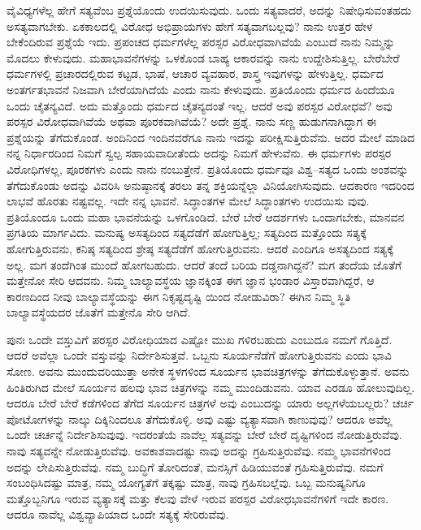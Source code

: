 ವೈವಿಧ್ಯಗಳೆಲ್ಲ ಹೇಗೆ ಸತ್ಯವೆಂಬ ಪ್ರಶ್ನೆಯೊಂದು ಉದಯಿಸುವುದು. ಒಂದು ಸತ್ಯವಾದರೆ, ಅದನ್ನು ನಿಷೇಧಿಸುವಂತಹದು ಅಸತ್ಯವಾಗಬೇಕು. ಏಕಕಾಲದಲ್ಲಿ ವಿರೋಧ ಅಭಿಪ್ರಾಯಗಳು ಹೇಗೆ ಸತ್ಯವಾಗಬಲ್ಲವು? ನಾನು ಉತ್ತರ ಹೇಳ ಬೇಕೆಂದಿರುವ ಪ್ರಶ್ನೆಯೆ ಇದು. ಪ್ರಪಂಚದ ಧರ್ಮಗಳೆಲ್ಲ ಪರಸ್ಪರ ವಿರೋಧವಾಗಿವೆಯೆ ಎಂಬುದೆ ನಾನು ನಿಮ್ಮನ್ನು ಮೊದಲು ಕೇಳುವುದು. ಮಹಾಭಾವನೆಗಳನ್ನು ಒಳಕೊಂಡ ಬಾಹ್ಯ ಆಕಾರವನ್ನು ನಾನು ಉದ್ದೇಶಿಸುತ್ತಿಲ್ಲ. ಬೇರೆಬೇರೆ ಧರ್ಮಗಳಲ್ಲಿ ಪ್ರಚಾರದಲ್ಲಿರುವ ಕಟ್ಟಡ, ಭಾಷೆ, ಆಚಾರ ವ್ಯವಹಾರ, ಶಾಸ್ತ್ರ ಇವುಗಳನ್ನು ಹೇಳುತ್ತಿಲ್ಲ. ಧರ್ಮದ ಅಂತರ್ಗತಭಾವನೆ ನಿಜವಾಗಿ ಬೇರೆಯಾಗಿದೆಯೆ ಎಂದು ನಾನು ಕೇಳುವುದು. ಪ್ರತಿಯೊಂದು ಧರ್ಮದ ಹಿಂದೆಯೂ ಒಂದು ಚೈತನ್ಯವಿದೆ. ಅದು ಮತ್ತೊಂದು ಧರ್ಮದ ಚೈತನ್ಯದಂತೆ ಇಲ್ಲ. ಆದರೆ ಅವು ಪರಸ್ಪರ ವಿರೋಧವೆ? ಅವು ಪರಸ್ಪರ ವಿರೋಧವಾಗಿವೆಯೆ ಅಥವಾ ಪೂರಕವಾಗಿವೆಯೆ? ಅದೇ ಪ್ರಶ್ನೆ. ನಾನು ಸಣ್ಣ ಹುಡುಗನಾಗಿದ್ದಾಗ ಈ ಪ್ರಶ್ನೆಯನ್ನು ತೆಗೆದುಕೊಂಡೆ. ಅಂದಿನಿಂದ ಇಂದಿನವರೆಗೂ ನಾನು ಇದನ್ನು ಪರೀಕ್ಷಿಸುತ್ತಿರುವೆನು. ಅದರ ಮೇಲೆ ಮಾಡಿದ ನನ್ನ ನಿರ್ಧಾರದಿಂದ ನಿಮಗೆ ಸ್ವಲ್ಪ ಸಹಾಯವಾದೀತೆಂದು ಅದನ್ನು ನಿಮಗೆ ಹೇಳುವೆನು. ಈ ಧರ್ಮಗಳು ಪರಸ್ಪರ ವಿರೋಧಿಗಳಲ್ಲ, ಪೂರಕಗಳು ಎಂದು ನಾನು ನಂಬುತ್ತೇನೆ. ಪ್ರತಿಯೊಂದು ಧರ್ಮವೂ ವಿಶ್ವ–ಸತ್ಯದ ಒಂದು ಅಂಶವನ್ನು ತೆಗೆದುಕೊಂಡು ಅದನ್ನು ವಿವರಿಸಿ ಅನುಷ್ಠಾನಕ್ಕೆ ತರಲು ತನ್ನ ಶಕ್ತಿಯನ್ನೆಲ್ಲಾ ವಿನಿಯೋಗಿಸುವುದು. ಆದಕಾರಣ ಇದರಿಂದ ಲಾಭವೆ ಹೊರತು ನಷ್ಟವಲ್ಲ. ಇದೇ ನನ್ನ ಭಾವನೆ. ಸಿದ್ಧಾಂತಗಳ ಮೇಲೆ ಸಿದ್ಧಾಂತಗಳು ಉದಯಿಸು ವುವು. ಪ್ರತಿಯೊಂದೂ ಒಂದು ಮಹಾ ಭಾವನೆಯನ್ನು ಒಳಗೊಂಡಿದೆ. ಬೇರೆ ಬೇರೆ ಆದರ್ಶಗಳು ಒಂದಾಗಬೇಕು, ಮಾನವನ ಪ್ರಗತಿಯ ಮಾರ್ಗವಿದು. ಮನುಷ್ಯ ಅಸತ್ಯದಿಂದ ಸತ್ಯದೆಡೆಗೆ ಹೋಗುತ್ತಿಲ್ಲ; ಸತ್ಯದಿಂದ ಮತ್ತೊಂದು ಸತ್ಯಕ್ಕೆ ಹೋಗುತ್ತಿರುವನು, ಕನಿಷ್ಠ ಸತ್ಯದಿಂದ ಶ್ರೇಷ್ಠ ಸತ್ಯದೆಡೆಗೆ ಹೋಗುತ್ತಿರುವನು. ಆದರೆ ಎಂದಿಗೂ ಅಸತ್ಯದಿಂದ ಸತ್ಯಕ್ಕೆ ಅಲ್ಲ. ಮಗ ತಂದೆಗಿಂತ ಮುಂದೆ ಹೋಗಬಹುದು. ಆದರೆ ತಂದೆ ಬರಿಯ ದಡ್ಡನಾಗಿದ್ದನೆ? ಮಗ ತಂದೆಯ ಜೊತೆಗೆ ಮತ್ತೇನೋ ಸೇರಿ ಆದವನು. ನಿಮ್ಮ ಬಾಲ್ಯಾವಸ್ಥೆಯ ಜ್ಞಾನಕ್ಕಿಂತ ಈಗ ಜ್ಞಾನ ಭಂಡಾರ ವಿಸ್ತಾರವಾಗಿದ್ದರೆ, ಆ ಕಾರಣದಿಂದ ನೀವು ಬಾಲ್ಯಾವಸ್ಥೆಯನ್ನು ಈಗ ನಿಕೃಷ್ಟದೃಷ್ಟಿ ಯಿಂದ ನೋಡುವಿರಾ? ಈಗಿನ ನಿಮ್ಮ ಸ್ಥಿತಿ ಬಾಲ್ಯಾವಸ್ಥೆಯದರ ಜೊತೆಗೆ ಮತ್ತೇನೊ ಸೇರಿ ಆಗಿದೆ.

ಪುನಃ ಒಂದೇ ವಸ್ತುವಿಗೆ ಪರಸ್ಪರ ವಿರೋಧಿಯಾದ ಎಷ್ಟೋ ಮುಖ ಗಳಿರಬಹುದು ಎಂಬುದೂ ನಮಗೆ ಗೊತ್ತಿದೆ. ಆದರೆ ಅವೆಲ್ಲಾ ಒಂದೇ ವಸ್ತುವನ್ನು ನಿರ್ದೇಶಿಸುತ್ತವೆ. ಒಬ್ಬನು ಸೂರ್ಯನೆಡೆಗೆ ಹೋಗುತ್ತಿರುವನು ಎಂದು ಭಾವಿ ಸೋಣ. ಅವನು ಮುಂದುವರಿಯುತ್ತಾ ಅನೇಕ ಸ್ಥಳಗಳಿಂದ ಸೂರ್ಯನ ಭಾವಚಿತ್ರಗಳನ್ನು ತೆಗೆದುಕೊಳ್ಳುತ್ತಾನೆ. ಅವನು ಹಿಂತಿರುಗಿದ ಮೇಲೆ ಸೂರ್ಯನ ಹಲವು ಭಾವ ಚಿತ್ರಗಳನ್ನು ನಮ್ಮ ಮುಂದಿಡುವನು. ಯಾವ ಎರಡೂ ಹೋಲುವುದಿಲ್ಲ. ಆದರೂ ಬೇರೆ ಬೇರೆ ಕಡೆಗಳಿಂದ ತೆಗೆದ ಸೂರ್ಯನ ಚಿತ್ರಗಳೆ ಅವು ಎಂಬುದನ್ನು ಯಾರು ಅಲ್ಲಗಳೆಯಬಲ್ಲರು? ಚರ್ಚಿ ಪೋಟೋಗಳನ್ನು ನಾಲ್ಕು ದಿಕ್ಕಿನಿಂದಲೂ ತೆಗೆದುಕೊಳ್ಳಿ. ಅವು ಎಷ್ಟು ವ್ಯತ್ಯಾಸವಾಗಿ ಕಾಣುವುವು? ಆದರೂ ಅವೆಲ್ಲ ಒಂದೇ ಚರ್ಚನ್ನೆ ನಿರ್ದೇಶಿಸುವುವು. ಇದರಂತೆಯೆ ನಾವೆಲ್ಲ ಸತ್ಯವನ್ನು ಬೇರೆ ಬೇರೆ ದೃಷ್ಟಿಗಳಿಂದ ನೋಡುತ್ತಿರುವೆವು. ನಾವು ಸತ್ಯವನ್ನೇ ನೋಡುತ್ತಿರುವೆವು. ಅವಕಾಶವಾದಷ್ಟು ನಾವು ಅದನ್ನು ಗ್ರಹಿಸುತ್ತಿರುವೆವು. ನಮ್ಮ ಭಾವನೆಗಳಿಂದ ಅದನ್ನು ಲೇಪಿಸುತ್ತಿರುವೆವು. ನಮ್ಮ ಬುದ್ಧಿಗೆ ತೋರಿದಂತೆ, ಮನಸ್ಸಿಗೆ ಹಿಡಿಯುವಂತೆ ಗ್ರಹಿಸುತ್ತಿರುವೆವು. ನಮಗೆ ಸಂಬಂಧಿಸಿದಷ್ಟು ಮಾತ್ರ, ನಮ್ಮ ಯೋಗ್ಯತೆಗೆ ತಕ್ಕಷ್ಟು ಮಾತ್ರ, ನಾವು ಗ್ರಹಿಸಬಲ್ಲೆವು. ಒಬ್ಬ ಮನುಷ್ಯನಿಗೂ ಮತ್ತೊಬ್ಬನಿಗೂ ಇರುವ ವ್ಯತ್ಯಾಸಕ್ಕೆ ಮತ್ತು ಕೆಲವು ವೇಳೆ ಇರುವ ಪರಸ್ಪರ ವಿರೋಧಭಾವನೆಗಳಿಗೆ ಇದೇ ಕಾರಣ. ಆದರೂ ನಾವೆಲ್ಲ ವಿಶ್ವವ್ಯಾಪಿಯಾದ ಒಂದೇ ಸತ್ಯಕ್ಕೆ ಸೇರಿರುವೆವು.

